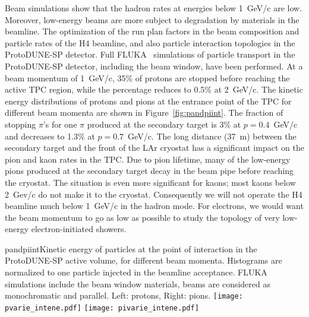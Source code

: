 Beam simulations show that the hadron rates at 
energies below 1~GeV/c are low. Moreover, low-energy beams are more
subject to degradation by materials in the
beamline.  The optimization of the run plan factors in the beam composition and particle rates of the H4 beamline, and 
also particle interaction topologies in the ProtoDUNE-SP detector. Full FLUKA~%
simulations of particle transport in the ProtoDUNE-SP detector, including the
beam window, have been performed.
%
At a beam momentum of 1~GeV/c, 35\% of protons are stopped before reaching the active TPC region, while the percentage reduces to 0.5\% at 2~GeV/c.  The kinetic energy distributions of protons and pions at the entrance point of the TPC for different beam momenta are shown in Figure~\ref{fig:pandpiint}. 
The fraction of stopping $\pi$'s for one $\pi$
produced at the secondary target is 3\% at $p=0.4$~GeV/c and decreases to 1.3\% at $p=0.7$~GeV/c.
%
The long distance (37~m) between the secondary target and the front of the LAr cryostat has a significant impact on the pion and kaon rates in the TPC. Due to pion lifetime, many of the  low-energy pions produced at the secondary target decay in the beam pipe before reaching the cryostat. The situation is even more significant for kaons; most kaons below 2~Gev/c do not make it to the cryostat.
Consequently we will not operate the H4 beamline much below 1~GeV/c in the hadron mode.
For electrons, we would want the beam momentum to go as low as possible to study the topology of very low-energy electron-initiated 
showers.
\begin{cdrfigure}{pandpiint}{Kinetic energy of
    particles at the point of interaction in the ProtoDUNE-SP active
    volume, for different beam momenta. Histograms are normalized to one particle injected in the
    beamline acceptance. FLUKA simulations include the beam window
    materials, beams are considered as monochromatic and
    parallel. Left: protons, Right: pions.}
  \texttt{[image: pvarie\_intene.pdf]}
  \texttt{[image: pivarie\_intene.pdf]}
\end{cdrfigure}


